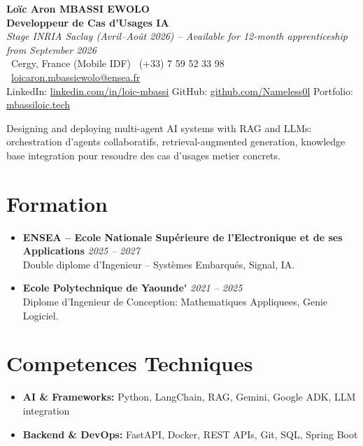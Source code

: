 \documentclass[a4paper,11pt]{article}
\begin{document}
\begin{center}
    {\Large \textbf{Lo\"ic Aron MBASSI EWOLO}} \\ \vspace{4pt}
    \textbf{\large Developpeur de Cas d'Usages IA} \\
    \textit{\small Stage INRIA Saclay (Avril--Ao\^ut 2026) -- Available for 12-month apprenticeship from September 2026} \\ \vspace{4pt}
    \small
    \Pointinghand\ Cergy, France (Mobile IDF) \quad
    \Mobilefone\ (+33) 7 59 52 33 98 \quad
    {\color{primary}\Letter\ \href{mailto:loicaron.mbassiewolo@ensea.fr}{loicaron.mbassiewolo@ensea.fr}} \\ \vspace{2pt}
    {\color{primary}LinkedIn: \href{https://www.linkedin.com/in/loic-mbassi/}{linkedin.com/in/loic-mbassi}} \quad
    {\color{primary}GitHub: \href{https://github.com/Nameless0l}{github.com/Nameless0l}} \quad
    {\color{primary}Portfolio: \href{https://mbassiloic.tech}{mbassiloic.tech}}
\end{center}

\vspace{-6pt}

\noindent\small{Designing and deploying multi-agent AI systems with RAG and LLMs: orchestration d'agents collaboratifs, retrieval-augmented generation, knowledge base integration pour resoudre des cas d'usages metier concrets.}

\section{Formation}
\begin{itemize}[leftmargin=*, label=\tiny$\bullet$, nosep]
    \item \textbf{ENSEA -- Ecole Nationale Sup\'erieure de l'Electronique et de ses Applications} \hfill \textit{2025 -- 2027} \\
    \small{Double diplome d'Ingenieur -- Syst\`emes Embarqu\'es, Signal, IA.}
    \item \textbf{Ecole Polytechnique de Yaounde\'} \hfill \textit{2021 -- 2025} \\
    \small{Diplome d'Ingenieur de Conception: Mathematiques Appliquees, Genie Logiciel.}
\end{itemize}

\section{Competences Techniques}
\begin{itemize}[leftmargin=*, nosep]
    \item \small{\textbf{AI \& Frameworks:} Python, LangChain, RAG, Gemini, Google ADK, LLM integration}
    \item \small{\textbf{Backend \& DevOps:} FastAPI, Docker, REST APIs, Git, SQL, Spring Boot}
\end{itemize}
\end{document}
